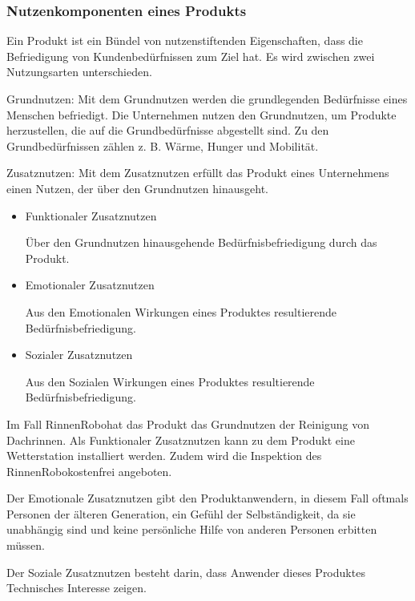     \subsubsection{Nutzenkomponenten eines Produkts}
        Ein Produkt ist ein Bündel von nutzenstiftenden Eigenschaften, dass die Befriedigung von Kundenbedürfnissen zum
        Ziel hat. Es wird zwischen zwei Nutzungsarten unterschieden.

        Grundnutzen: Mit dem Grundnutzen werden die grundlegenden Bedürfnisse eines Menschen befriedigt. Die Unternehmen
        nutzen den Grundnutzen, um Produkte herzustellen, die auf die Grundbedürfnisse abgestellt sind. Zu den
        Grundbedürfnissen zählen z. B. Wärme, Hunger und Mobilität.

        Zusatznutzen: Mit dem Zusatznutzen erfüllt das Produkt eines Unternehmens einen Nutzen, der über den Grundnutzen
        hinausgeht.

            \begin{itemize}
                \item Funktionaler Zusatznutzen
                
                    Über den Grundnutzen hinausgehende Bedürfnisbefriedigung durch das Produkt.

                \item Emotionaler Zusatznutzen
                
                    Aus den Emotionalen Wirkungen eines Produktes resultierende Bedürfnisbefriedigung.

                \item Sozialer Zusatznutzen
                
                    Aus den Sozialen Wirkungen eines Produktes resultierende Bedürfnisbefriedigung.
            \end{itemize}

        Im Fall \as RinnenRobo\adl hat das Produkt das Grundnutzen der Reinigung von Dachrinnen. Als Funktionaler
        Zusatznutzen kann zu dem Produkt eine Wetterstation installiert werden. Zudem wird die Inspektion des
        \as RinnenRobo\adl kostenfrei angeboten. 
            
        Der Emotionale Zusatznutzen gibt den Produktanwendern, in diesem Fall oftmals Personen der älteren Generation,
        ein Gefühl der Selbständigkeit, da sie unabhängig sind und keine persönliche Hilfe von anderen Personen erbitten
        müssen. 
        
        Der Soziale Zusatznutzen besteht darin, dass Anwender dieses Produktes Technisches Interesse zeigen. 
            
